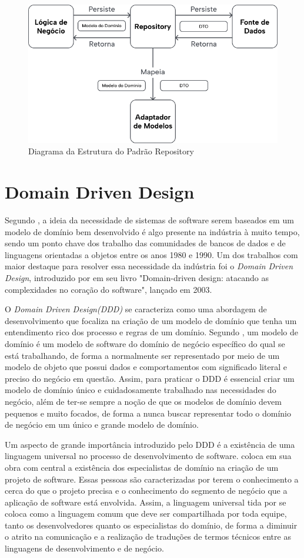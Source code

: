 \documentclass[12pt, %
openright, 
oneside, %
a4paper,    %
brazil]{facom-ufu-abntex2}
\begin{document}
\begin{figure}[ht]
    \centering
    \includegraphics[width=.65\textwidth]{figures/design_patterns/repository_diagram.png}
    \caption{Diagrama da Estrutura do Padrão Repository}
    \label{fig:repository_diagram}
\end{figure}

\section{Domain Driven Design}
Segundo , a ideia da necessidade de sistemas de software serem baseados em um modelo de domínio bem desenvolvido é algo presente na indústria à muito tempo, sendo um ponto chave dos trabalho das comunidades de bancos de dados e de linguagens orientadas a objetos entre os anos 1980 e 1990. Um dos trabalhos com maior destaque para resolver essa necessidade da indústria foi o \textit{Domain Driven Design}, introduzido por  em seu livro "Domain-driven design: atacando as complexidades no coração do software", lançado em 2003.

O \textit{Domain Driven Design(DDD)} se caracteriza como uma abordagem de desenvolvimento que focaliza na criação de um modelo de domínio que tenha um entendimento rico dos processo e regras de um domínio. Segundo , um modelo de domínio é um modelo de software do domínio de negócio específico do qual se está trabalhando, de forma a normalmente ser representado por meio de um modelo de objeto que possui dados e comportamentos com significado literal e preciso do negócio em questão. Assim, para praticar o DDD é essencial criar um modelo de domínio único e cuidadosamente trabalhado nas necessidades do negócio, além de ter-se sempre a noção de que os modelos de domínio devem pequenos e muito focados, de forma a nunca buscar representar todo o domínio de negócio em um único e grande modelo de domínio.

Um aspecto de grande importância introduzido pelo DDD é a existência de uma linguagem universal no processo de desenvolvimento de software.  coloca em sua obra com central a existência dos especialistas de domínio na criação de um projeto de software. Essas pessoas são caracterizadas por terem o conhecimento a cerca do que o projeto precisa e o conhecimento do segmento de negócio que a aplicação de software está envolvida. Assim, a linguagem universal tida por  se coloca como a linguagem comum que deve ser compartilhada por toda equipe, tanto os desenvolvedores quanto os especialistas do domínio, de forma a diminuir o atrito na comunicação e a realização de traduções de termos técnicos entre as linguagens de desenvolvimento e de negócio.
\end{document}
